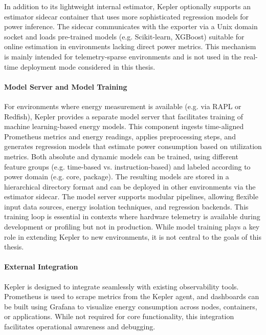 In addition to its lightweight internal estimator, Kepler optionally supports an estimator sidecar container that uses more sophisticated regression models for power inference. The sidecar communicates with the exporter via a Unix domain socket and loads pre-trained models (e.g. Scikit-learn, XGBoost) suitable for online estimation in environments lacking direct power metrics. This mechanism is mainly intended for telemetry-sparse environments and is not used in the real-time deployment mode considered in this thesis.

\paragraph{Model Server and Model Training}

For environments where energy measurement is available (e.g. via RAPL or Redfish), Kepler provides a separate model server that facilitates training of machine learning-based energy models. This component ingests time-aligned Prometheus metrics and energy readings, applies preprocessing steps, and generates regression models that estimate power consumption based on utilization metrics. Both absolute and dynamic models can be trained, using different feature groups (e.g. time-based vs. instruction-based) and labeled according to power domain (e.g. core, package). The resulting models are stored in a hierarchical directory format and can be deployed in other environments via the estimator sidecar. The model server supports modular pipelines, allowing flexible input data sources, energy isolation techniques, and regression backends. This training loop is essential in contexts where hardware telemetry is available during development or profiling but not in production. While model training plays a key role in extending Kepler to new environments\parencite{choochotkaewAdvancingCloudSustainability2023}, it is not central to the goals of this thesis.

\paragraph{External Integration}

Kepler is designed to integrate seamlessly with existing observability tools. Prometheus is used to scrape metrics from the Kepler agent, and dashboards can be built using Grafana to visualize energy consumption across nodes, containers, or applications. While not required for core functionality, this integration facilitates operational awareness and debugging.

